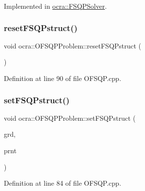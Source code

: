 Implemented in \hyperlink{classocra_1_1FSQPSolver_a1275a02361629480cc18d44ce46d915c}{ocra\+::\+F\+S\+Q\+P\+Solver}.

\hypertarget{classocra_1_1OFSQPProblem_a774f1a1e9d5014ea878b8de4750c3a13}{}\label{classocra_1_1OFSQPProblem_a774f1a1e9d5014ea878b8de4750c3a13} 
\subsubsection{\texorpdfstring{reset\+F\+S\+Q\+Pstruct()}{resetFSQPstruct()}}
{\footnotesize\ttfamily void ocra\+::\+O\+F\+S\+Q\+P\+Problem\+::reset\+F\+S\+Q\+Pstruct (\begin{DoxyParamCaption}{ }\end{DoxyParamCaption})}



Definition at line 90 of file O\+F\+S\+Q\+P.\+cpp.

\hypertarget{classocra_1_1OFSQPProblem_ae57b5fa2934e2ae619e748079335d3b7}{}\label{classocra_1_1OFSQPProblem_ae57b5fa2934e2ae619e748079335d3b7} 
\subsubsection{\texorpdfstring{set\+F\+S\+Q\+Pstruct()}{setFSQPstruct()}}
{\footnotesize\ttfamily void ocra\+::\+O\+F\+S\+Q\+P\+Problem\+::set\+F\+S\+Q\+Pstruct (\begin{DoxyParamCaption}\item[{\hyperlink{structocra_1_1fsqpDetails_1_1Grd}{fsqp\+Details\+::\+Grd} \&}]{grd,  }\item[{\hyperlink{structocra_1_1fsqpDetails_1_1Prnt}{fsqp\+Details\+::\+Prnt} \&}]{prnt }\end{DoxyParamCaption})}



Definition at line 84 of file O\+F\+S\+Q\+P.\+cpp.

\hypertarget{classocra_1_1OFSQPProblem_a4877a5ab95e85c32c32eca22d2db1147}{}\label{classocra_1_1OFSQPProblem_a4877a5ab95e85c32c32eca22d2db1147} 
